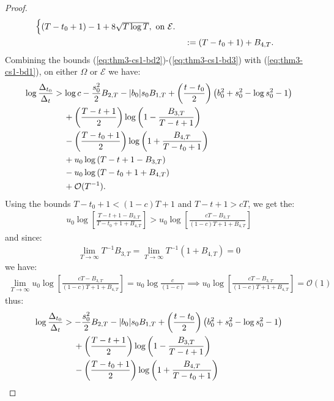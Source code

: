 \begin{proof}
\begin{align}
\begin{cases}
    (T - t_0 + 1) -1 + 8\sqrt{T \log T}, \text{ on } \mathcal{E}.
    \end{cases} \notag \\
    &:= (T - t_0 + 1) + B_{4,T}.
    \label{eq:thm3-cs1-bd3}
\end{align}
\normalsize
Combining the bounds (\ref{eq:thm3-cs1-bd2})-(\ref{eq:thm3-cs1-bd3}) with (\ref{eq:thm3-cs1-bd1}), on either $\Omega$ or $\mathcal{E}$ we have:
\begin{align*}
    \log \frac{\Delta_{t_0}}{\Delta_t} &> \log c  - \frac{s_0^2 }{2}B_{2,T} - | b_0| s_0 B_{1,T} + \left(\frac{t-t_0}{2}\right)\left(b_0^2 + s_0^2 - \log s_0^2 - 1\right) \notag \\
    &\quad\: + \left(\frac{T - t+1}{2}\right)\log\left(1 - \frac{B_{3,T}}{T-t+1}\right)\\
    &\quad\: - \left(\frac{T - t_0+1}{2}\right)\log\left(1 + \frac{B_{4,T}}{T-t_0+1}\right)  \\
    &\quad\: + u_0\log\left(T - t + 1 - B_{3,T}\right) \\
    &\quad\: - u_0\log\left(T-t_0 + 1 + B_{4,T}\right) \\
    &\quad\: + \mathcal{O}(T^{-1}).
\end{align*}
Using the bounds $T - t_0 + 1 < (1-c)T + 1$ and $T-t +1> cT$, we get the:
\begin{align*}
    u_0\log\left[\frac{T - t + 1 - B_{3,T}}{T-t_0 + 1 + B_{4,T}}\right] > u_0\log \left[\frac{cT - B_{3,T}}{(1-c)T  + 1 + B_{4,T}}\right]
\end{align*}
and since:
\begin{align*}
    \lim_{T\to\infty} T^{-1} B_{3,T} = \lim_{T\to\infty} T^{-1} (1 + B_{4,T}) = 0
\end{align*}
we have: 
\begin{align*}
    \lim_{T \to \infty} u_0\log \left[\frac{cT - B_{3,T}}{(1-c)T  + 1 + B_{4,T}}\right] =  u_0\log \frac{c}{(1-c)} \implies u_0\log \left[\frac{cT - B_{3,T}}{(1-c)T  + 1 + B_{4,T}}\right] = \mathcal{O}(1)
\end{align*}
thus:
\begin{align}
    \log \frac{\Delta_{t_0}}{\Delta_t} &> - \frac{s_0^2 }{2}B_{2,T} - | b_0| s_0 B_{1,T} + \left(\frac{t-t_0}{2}\right)\left(b_0^2 + s_0^2 - \log s_0^2 - 1\right) \notag \\
    &\quad\: + \left(\frac{T - t+1}{2}\right)\log\left(1 - \frac{B_{3,T}}{T-t+1}\right) \notag\\
    &\quad\: - \left(\frac{T - t_0+1}{2}\right)\log\left(1 + \frac{B_{4,T}}{T-t_0+1}\right)  \notag \\

\end{align}
\end{proof}
